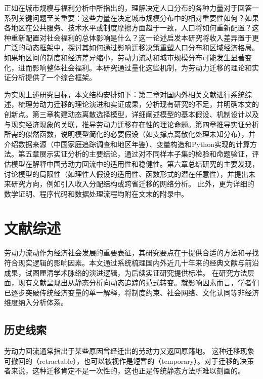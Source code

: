 \documentclass[a4paper, zihao=-4, fontset = mac, oneside]{ctexbook} %
\begin{document}
正如\textcite{desmetUrbanAccountingWelfare2013}在城市规模与福利分析中所指出的，理解决定人口分布的各种力量对于回答一系列关键问题至关重要：这些力量在决定城市规模分布中的相对重要性如何？如果各地区在公共服务、技术水平或制度摩擦方面趋于一致，人口将如何重新配置？这种重新配置对社会福利的总体影响是什么？这一论述启发本研究将收入差异置于更广泛的动态框架中，探讨其如何通过影响迁移决策重塑人口分布和区域经济格局。如果地区间的制度和经济差异缩小，劳动力流动和城市规模分布可能发生显著变化，进而影响整体社会福利。本研究通过量化这些机制，为劳动力迁移的理论和实证分析提供了一个综合框架。

为实现上述研究目标，本文结构安排如下：第二章对国内外相关文献进行系统综述，梳理劳动力迁移的理论演进和实证成果，分析现有研究的不足，并明确本文的创新点。第三章构建动态离散选择模型，详细阐述模型的基本假设、机制设计以及与现实经济现象的关联，推导劳动力迁移存在性的理论命题。第四章推导实证分析所需的似然函数，说明模型简化的必要假设（如支撑点离散化处理未知分布），并介绍数据来源（中国家庭追踪调查和地区年鉴）、变量构造和Python实现的计算方法。第五章展示实证分析的主要结论，通过对不同样本子集的检验和命题验证，评估模型在解释中国劳动力回流中的适用性和稳健性。第六章总结研究的主要发现，讨论模型的局限性（如理性人假设的适用性、函数形式的潜在任意性），并提出未来研究方向，例如引入收入分配结构或跨省迁移的网络分析。
此外，更为详细的数学证明、程序代码和数据处理流程均附在文末的附录中。



\chapter{文献综述}

劳动力流动作为经济社会发展的重要表征，其研究要点在于提供合适的方法和寻找符合现实逻辑的影响因素。本文通过系统梳理国内外近几十年来的经典文献与前沿成果，试图厘清学术脉络的演进逻辑，为后续实证研究提供标准。
在研究方法层面，现有文献呈现出从静态分析向动态追踪的范式转变。就影响因素而言，学者们已逐步突破传统经济变量的单一解释，将制度约束、社会网络、文化认同等非经济维度纳入分析体系。

\section{历史线索}
\label{sec:_历史线索}


劳动力回流通常指出于某些原因曾经迁出的劳动力又返回原籍地。
这种迁移现象可撤回的（retractable），也可以被视作是短暂的（temporary）。对于迁移的决策者来说，这种迁移肯定不是一次性的，这也正是传统静态方法所难以刻画的。
\end{document}
